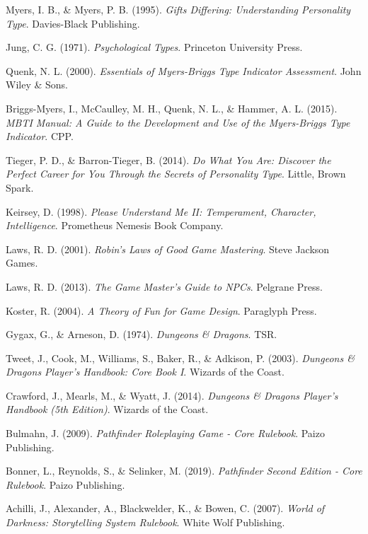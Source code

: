 Myers, I. B., \& Myers, P. B. (1995). 
\textit{Gifts Differing: Understanding Personality Type}. 
Davies-Black Publishing.

Jung, C. G. (1971). 
\textit{Psychological Types}. 
Princeton University Press.

Quenk, N. L. (2000). 
\textit{Essentials of Myers-Briggs Type Indicator Assessment}. 
John Wiley \& Sons.

Briggs-Myers, I., McCaulley, M. H., Quenk, N. L., \& Hammer, A. L. (2015). 
\textit{MBTI Manual: A Guide to the Development and Use of the Myers-Briggs Type Indicator}. 
CPP.

Tieger, P. D., \& Barron-Tieger, B. (2014). 
\textit{Do What You Are: Discover the Perfect Career for You Through the Secrets of Personality Type}. 
Little, Brown Spark.

Keirsey, D. (1998). 
\textit{Please Understand Me II: Temperament, Character, Intelligence}. 
Prometheus Nemesis Book Company.

Laws, R. D. (2001). 
\textit{Robin's Laws of Good Game Mastering}. 
Steve Jackson Games.

Laws, R. D. (2013). 
\textit{The Game Master's Guide to NPCs}. 
Pelgrane Press.

Koster, R. (2004). 
\textit{A Theory of Fun for Game Design}. 
Paraglyph Press.

Gygax, G., \& Arneson, D. (1974).
\textit{Dungeons \& Dragons}.
TSR.

Tweet, J., Cook, M., Williams, S., Baker, R., \& Adkison, P. (2003).
\textit{Dungeons \& Dragons Player's Handbook: Core Book I}.
Wizards of the Coast.

Crawford, J., Mearls, M., \& Wyatt, J. (2014).
\textit{Dungeons \& Dragons Player's Handbook (5th Edition)}.
Wizards of the Coast.

Bulmahn, J. (2009).
\textit{Pathfinder Roleplaying Game - Core Rulebook}.
Paizo Publishing.

Bonner, L., Reynolds, S., \& Selinker, M. (2019).
\textit{Pathfinder Second Edition - Core Rulebook}.
Paizo Publishing.

Achilli, J., Alexander, A., Blackwelder, K., \& Bowen, C. (2007). 
\textit{World of Darkness: Storytelling System Rulebook}. 
White Wolf Publishing.

